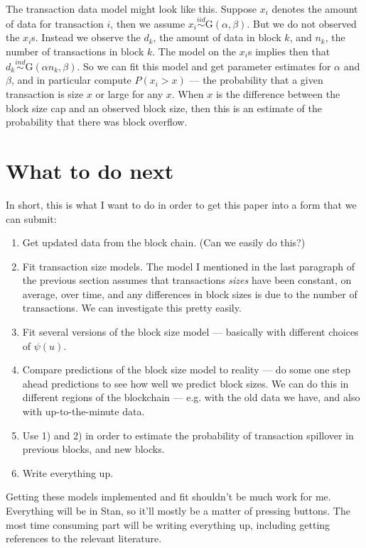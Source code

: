 \documentclass[12pt]{article}
\begin{document}
The transaction data model might look like this. Suppose $x_i$ denotes the amount of data for transaction $i$, then we assume $x_i \stackrel{iid}{\sim}\mathrm{G}(\alpha, \beta)$. But we do not observed the $x_i$s. Instead we observe the $d_k$, the amount of data in block $k$, and $n_k$, the number of transactions in block $k$. The model on the $x_i$s implies then that $d_k \stackrel{ind}{\sim} \mathrm{G}(\alpha n_k, \beta)$. So we can fit this model and get parameter estimates for $\alpha$ and $\beta$, and in particular compute $P(x_i > x)$ --- the probability that a given transaction is size $x$ or large for any $x$. When $x$ is the difference between the block size cap and an observed block size, then this is an estimate of the probability that there was block overflow.

\section{What to do next}
In short, this is what I want to do in order to get this paper into a form that we can submit:
\begin{enumerate}
\item Get updated data from the block chain. (Can we easily do this?)
\item Fit transaction size models. The model I mentioned in the last paragraph of the previous section assumes that transactions {\it sizes} have been constant, on average, over time, and any differences in block sizes is due to the number of transactions. We can investigate this pretty easily.
\item Fit several versions of the block size model --- basically with different choices of $\psi(u)$.
\item Compare predictions of the block size model to reality --- do some one step ahead predictions to see how well we predict block sizes. We can do this in different regions of the blockchain --- e.g. with the old data we have, and also with up-to-the-minute data.
\item Use 1) and 2) in order to estimate the probability of transaction spillover in previous blocks, and new blocks.
\item Write everything up.
\end{enumerate}

Getting these models implemented and fit shouldn't be much work for me. Everything will be in Stan, so it'll mostly be a matter of pressing buttons. The most time consuming part will be writing everything up, including getting references to the relevant literature.
\end{document}
